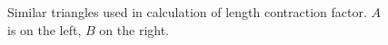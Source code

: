 \documentclass[../relativity_main.tex]{subfiles}
\begin{document}
\begin{figure}
	\centering


	\hspace*{0.1\textwidth}%

	\caption{Similar triangles used in calculation of length contraction factor. $A$ is on the left, $B$ on the right.}
	\label{fig:length_contraction_calc_help}
\end{figure}
\end{document}
